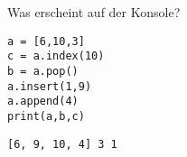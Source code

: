 \question[3]
Was erscheint auf der Konsole?
\begin{lstlisting}
a = [6,10,3]
c = a.index(10)
b = a.pop()
a.insert(1,9)
a.append(4)
print(a,b,c)
\end{lstlisting}

\begin{solutionbox}{1cm}
\texttt{[6, 9, 10, 4] 3 1}
\end{solutionbox}
